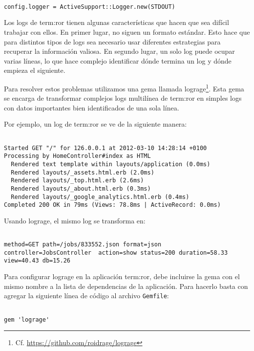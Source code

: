 \begin{lstlisting}

config.logger = ActiveSupport::Logger.new(STDOUT)

\end{lstlisting}

Los logs de \gls{term:ror} tienen algunas características que hacen que sea
difícil trabajar con ellos. En primer lugar, no siguen un formato estándar.
Esto hace que para distintos tipos de logs sea necesario usar diferentes
estrategias para recuperar la información valiosa. En segundo lugar, un solo
log puede ocupar varias líneas, lo que hace complejo identificar dónde termina
un log y dónde empieza el siguiente.

Para resolver estos problemas utilizamos una gema llamada lograge\footnote{Cf.
\url{https://github.com/roidrage/lograge}}. Esta gema se encarga de transformar
complejos logs multilínea de \gls{term:ror} en simples logs con datos
importantes bien identificados de una sola línea.

Por ejemplo, un log de \gls{term:ror} se ve de la siguiente manera:

\begin{lstlisting}

Started GET "/" for 126.0.0.1 at 2012-03-10 14:28:14 +0100
Processing by HomeController#index as HTML
  Rendered text template within layouts/application (0.0ms)
  Rendered layouts/_assets.html.erb (2.0ms)
  Rendered layouts/_top.html.erb (2.6ms)
  Rendered layouts/_about.html.erb (0.3ms)
  Rendered layouts/_google_analytics.html.erb (0.4ms)
Completed 200 OK in 79ms (Views: 78.8ms | ActiveRecord: 0.0ms)

\end{lstlisting}

Usando lograge, el mismo log se transforma en:

\begin{lstlisting}

method=GET path=/jobs/833552.json format=json controller=JobsController  action=show status=200 duration=58.33 view=40.43 db=15.26

\end{lstlisting}

Para configurar lograge en la aplicación \gls{term:ror}, debe incluirse la gema
con el mismo nombre a la lista de dependencias de la aplicación. Para hacerlo
basta con agregar la siguiente línea de código al archivo \texttt{Gemfile}:

\begin{lstlisting}

gem 'lograge'

\end{lstlisting}

